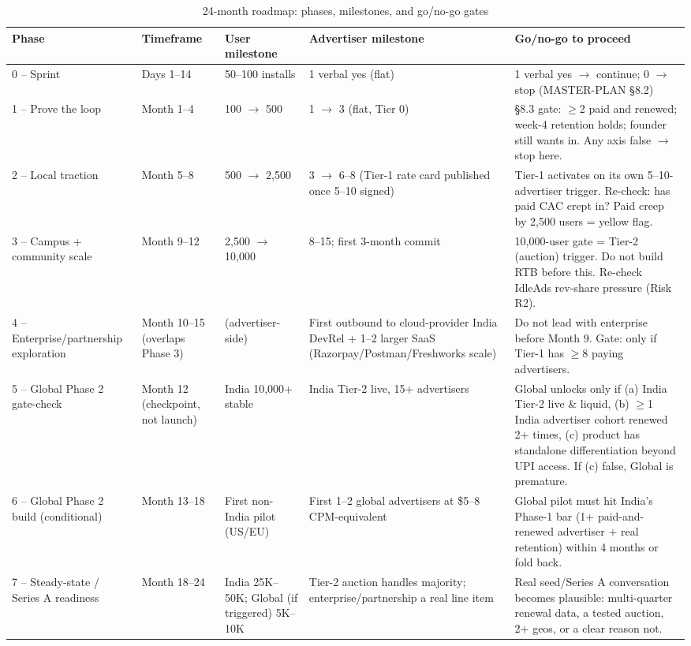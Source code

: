 \begin{table}[htbp]
\centering
\caption{24-month roadmap: phases, milestones, and go/no-go gates}
\label{tab:roadmap}
\begin{tabular}{@{}p{1.8cm}p{1.6cm}p{2.0cm}p{2.0cm}p{3.6cm}@{}}
\toprule
\textbf{Phase} & \textbf{Timeframe} & \textbf{User milestone} & \textbf{Advertiser milestone} & \textbf{Go/no-go to proceed} \\
\midrule
0 -- Sprint & Days 1--14 & 50--100 installs & 1 verbal yes (flat) & 1 verbal yes $\rightarrow$ continue; 0 $\rightarrow$ stop (MASTER-PLAN \S8.2) \\
1 -- Prove the loop & Month 1--4 & 100 $\rightarrow$ 500 & 1 $\rightarrow$ 3 (flat, Tier 0) & \S8.3 gate: $\geq$2 paid and renewed; week-4 retention holds; founder still wants in. Any axis false $\rightarrow$ stop here. \\
2 -- Local traction & Month 5--8 & 500 $\rightarrow$ 2{,}500 & 3 $\rightarrow$ 6--8 (Tier-1 rate card published once 5--10 signed) & Tier-1 activates on its own 5--10-advertiser trigger. Re-check: has paid CAC crept in? Paid creep by 2{,}500 users = yellow flag. \\
3 -- Campus + community scale & Month 9--12 & 2{,}500 $\rightarrow$ 10{,}000 & 8--15; first 3-month commit & 10{,}000-user gate = Tier-2 (auction) trigger. Do not build RTB before this. Re-check IdleAds rev-share pressure (Risk R2). \\
4 -- Enterprise/partnership exploration & Month 10--15 (overlaps Phase 3) & (advertiser-side) & First outbound to cloud-provider India DevRel + 1--2 larger SaaS (Razorpay/Postman/Freshworks scale) & Do not lead with enterprise before Month 9. Gate: only if Tier-1 has $\geq$8 paying advertisers. \\
5 -- Global Phase 2 gate-check & Month 12 (checkpoint, not launch) & India 10{,}000+ stable & India Tier-2 live, 15+ advertisers & Global unlocks only if (a) India Tier-2 live \& liquid, (b) $\geq$1 India advertiser cohort renewed 2+ times, (c) product has standalone differentiation beyond UPI access. If (c) false, Global is premature. \\
6 -- Global Phase 2 build (conditional) & Month 13--18 & First non-India pilot (US/EU) & First 1--2 global advertisers at \$5--8 CPM-equivalent & Global pilot must hit India's Phase-1 bar (1+ paid-and-renewed advertiser + real retention) within 4 months or fold back. \\
7 -- Steady-state / Series A readiness & Month 18--24 & India 25K--50K; Global (if triggered) 5K--10K & Tier-2 auction handles majority; enterprise/partnership a real line item & Real seed/Series A conversation becomes plausible: multi-quarter renewal data, a tested auction, 2+ geos, or a clear reason not. \\
\bottomrule
\end{tabular}
\end{table}

